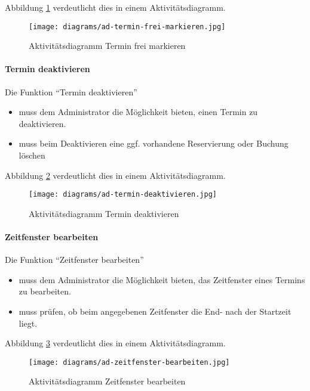 Abbildung \ref{fig:ad-termin-frei-markieren} verdeutlicht dies in einem Aktivitätsdiagramm.

\begin{figure}
  \centering
  \texttt{[image: diagrams/ad-termin-frei-markieren.jpg]}
  \caption{Aktivitätsdiagramm Termin frei markieren}
  \label{fig:ad-termin-frei-markieren}
\end{figure}

\paragraph{Termin deaktivieren}

Die Funktion ``Termin deaktivieren''
\begin{itemize}
  \item muss dem Administrator die Möglichkeit bieten, einen Termin zu deaktivieren.
  \item muss beim Deaktivieren eine ggf. vorhandene Reservierung oder Buchung löschen
\end{itemize}

Abbildung \ref{fig:ad-termin-deaktivieren} verdeutlicht dies in einem Aktivitätsdiagramm.

\begin{figure}
  \centering
  \texttt{[image: diagrams/ad-termin-deaktivieren.jpg]}
  \caption{Aktivitätsdiagramm Termin deaktivieren}
\label{fig:ad-termin-deaktivieren}
\end{figure}

\paragraph{Zeitfenster bearbeiten}

Die Funktion ``Zeitfenster bearbeiten''
\begin{itemize}
  \item muss dem Administrator die Möglichkeit bieten, das Zeitfenster eines Termins zu bearbeiten.
  \item muss prüfen, ob beim angegebenen Zeitfenster die End- nach der Startzeit liegt.
\end{itemize}

Abbildung \ref{fig:ad-zeitfenster-bearbeiten} verdeutlicht dies in einem Aktivitätsdiagramm.

\begin{figure}
  \centering
  \texttt{[image: diagrams/ad-zeitfenster-bearbeiten.jpg]}
  \caption{Aktivitätsdiagramm Zeitfenster bearbeiten}
\label{fig:ad-zeitfenster-bearbeiten}
\end{figure}

